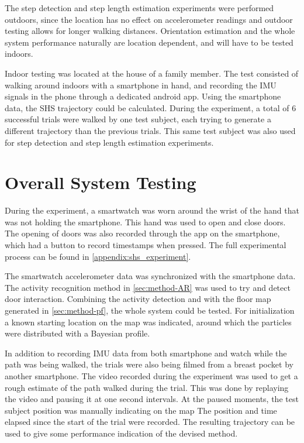 The step detection and step length estimation experiments were performed outdoors, since the location has no effect on accelerometer readings and outdoor testing allows for longer walking distances. Orientation estimation and the whole system performance naturally are location dependent, and will have to be tested indoors. \par

Indoor testing was located at the house of a family member. The test consisted of walking around indoors with a smartphone in hand, and recording the IMU signals in the phone through a dedicated android app. Using the smartphone data, the SHS trajectory could be calculated. During the experiment, a total of 6 successful trials were walked by one test subject, each trying to generate a different trajectory than the previous trials. This same test subject was also used for step detection and step length estimation experiments.

\section{Overall System Testing}

During the experiment, a smartwatch was worn around the wrist of the hand that was not holding the smartphone. This hand was used to open and close doors. The opening of doors was also recorded through the app on the smartphone, which had a button to record timestamps when pressed. The full experimental process can be found in \cref{appendix:shs_experiment}. \par

The smartwatch accelerometer data was synchronized with the smartphone data. The activity recognition method in \cref{sec:method-AR} was used to try and detect door interaction. Combining the activity detection and  with the floor map generated in \cref{sec:method-pf}, the whole system could be tested. For initialization a known starting location on the map was indicated, around which the particles were distributed with a Bayesian profile.  \par 

In addition to recording IMU data from both smartphone and watch while the path was being walked, the trials were also being filmed from a breast pocket by another smartphone. The video recorded during the experiment was used to get a rough estimate of the path walked during the trial. This was done by replaying the video and pausing it at one second intervals. At the paused moments, the test subject position was manually indicating on the map The position and time elapsed since the start of the trial were recorded. The resulting trajectory can be used to give some performance indication of the devised method. \par 

